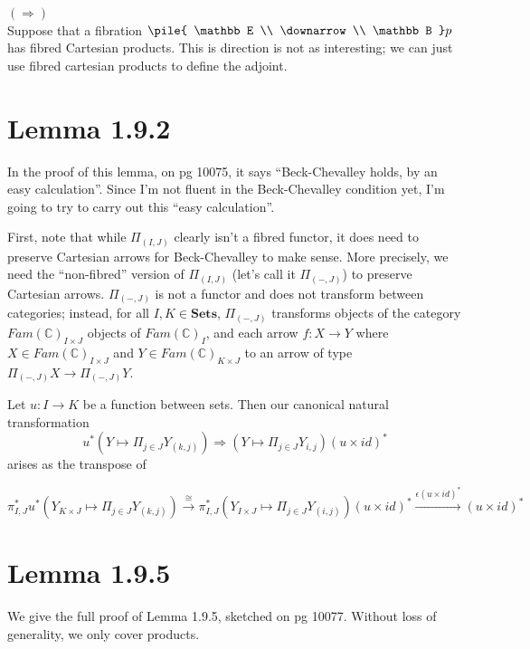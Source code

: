 \documentclass{article}
\newcommand{\mbf}{\mathbf}
\newcommand{\vrt}[2]{
\pile{
#1 \\
\downarrow \\
#2
}
}
\begin{document}
$(\Rightarrow)$~\\ 

Suppose that a fibration $\vrt{\mathbb E}{\mathbb B}p$ has fibred Cartesian products. 
This is direction is not as interesting; we can just use fibred cartesian products to define the adjoint.
 
\section*{Lemma 1.9.2}

In the proof of this lemma, on pg 10075, it says ``Beck-Chevalley holds, by an easy calculation''.
Since I'm not fluent in the Beck-Chevalley condition yet, I'm going to try to carry out this ``easy calculation''.

First, note that while $\Pi_{(I,J)}$ clearly isn't a fibred functor, it does need to preserve Cartesian arrows
for Beck-Chevalley to make sense. More precisely, we need the ``non-fibred'' version of $\Pi_{(I,J)}$ (let's
call it $\Pi_{(-,J)}$) to preserve Cartesian arrows. $\Pi_{(-,J)}$ is not a functor and does not transform between categories;
instead, for all $I,K \in \mbf{Sets}$,  $\Pi_{(-,J)}$ transforms objects of the category $Fam(\mathbb C)_{I \times J}$ 
objects of $Fam(\mathbb C)_{I}$, and each arrow $f : X \to Y$ where $X \in Fam(\mathbb C)_{I \times J}$ and $Y \in Fam(\mathbb C)_{K \times J}$ to an arrow of type $\Pi_{(-,J)} X \to \Pi_{(-,J)} Y$. 

Let $u : I \to K$ be a function between sets. Then our canonical natural transformation 
$$u^* (Y \mapsto \Pi_{j \in J} Y_{(k,j)}) \Longrightarrow (Y \mapsto \Pi_{j \in J} Y_{i,j}) (u \times id)^*$$
arises as the transpose of

$$\pi^*_{I,J} u^* (Y_{K \times J} \mapsto \Pi_{j \in J} Y_{(k,j)}) \overset{\cong}{\longrightarrow} \pi^*_{I,J} (Y_{I \times J} \mapsto \Pi_{j \in J} Y_{(i,j)}) (u \times id)^* \overset{\epsilon (u \times id)^*}{\longrightarrow} (u \times id)^*$$


\section{Lemma 1.9.5}

We give the full proof of Lemma 1.9.5, sketched on pg 10077. Without loss of generality, we only cover products.
\end{document}
